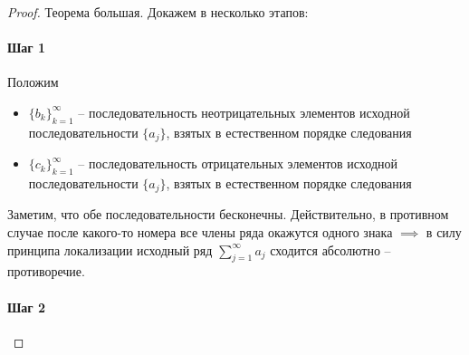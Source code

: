 \documentclass[11pt]{article}
\begin{document}
\begin{proof}
  Теорема большая. Докажем в несколько этапов:

  \paragraph{Шаг 1}
  
  Положим 
  \begin{itemize}
    \item $\{b_k\}_{k = 1}^{\infty}$ -- последовательность неотрицательных 
    элементов исходной последовательности $\{a_j\}$, взятых в естественном 
    порядке следования
    \item $\{c_k\}_{k = 1}^{\infty}$ -- последовательность отрицательных 
    элементов исходной последовательности $\{a_j\}$, взятых в естественном 
    порядке следования
  \end{itemize} \leavevmode
  Заметим, что обе последовательности бесконечны. Действительно, в противном 
  случае после какого-то номера все члены ряда окажутся одного знака $\implies$ 
  в силу принципа локализации исходный ряд $\displaystyle \sum_{j = 1}^{\infty} 
  a_j$ сходится абсолютно -- противоречие.

  \paragraph{Шаг 2}


\end{proof}
\end{document}

